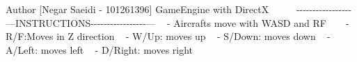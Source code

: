 \begin{DoxyAuthor}{Author}
\mbox{[}Negar Saeidi -\/ 101261396\mbox{]} Game\+Engine with DirectX ~\newline
~\newline
~\newline
 -\/-\/-\/-\/-\/-\/-\/-\/-\/-\/-\/-\/-\/-\/-\/-\/-\/---INSTRUCTIONS-\/-\/-\/-\/-\/-\/-\/-\/-\/-\/-\/-\/-\/-\/-\/-\/-\/--- ~\newline
 -\/ Aircrafts move with WASD and RF ~\newline
~\newline
 -\/R/F\+:Moves in Z direction ~\newline
 -\/ W/\+Up\+: moves up ~\newline
 -\/ S/\+Down\+: moves down ~\newline
 -\/ A/\+Left\+: moves left ~\newline
 -\/ D/\+Right\+: moves right ~\newline
 
\end{DoxyAuthor}
